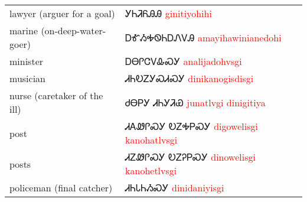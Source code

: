 \begin{multicols}
\begin{minipage}{\linewidth}
\begin{tabular}{p{5cm} p{9cm}}
lawyer (arguer for a goal) & ᎩᏂᏘᏲᎯᎯ 
 \newline \textcolor{red}{ginitiyohihi}\\
marine (on-deep-water-goer) & ᎠᎹᏱᎭᏫᏂᎠᏁᏙᎯ 
 \newline \textcolor{red}{amayihawinianedohi}\\
minister & ᎠᎾᎵᏣᏙᎲᏍᎩ 
 \newline \textcolor{red}{analijadohvsgi}\\
musician & ᏗᏂᎧᏃᎩᏍᏗᏍᎩ 
 \newline \textcolor{red}{dinikanogisdisgi}\\
nurse (caretaker of the ill) & ᏧᎾᏢᎩ ᏗᏂᎩᏘᏯ 
 \newline \textcolor{red}{junatlvgi dinigitiya}\\
post & ᏗᎪᏪᎵᏍᎩ ᎧᏃᎭᏢᏍᎩ 
 \newline \textcolor{red}{digowelisgi kanohatlvsgi}\\
posts & ᏗᏃᏪᎵᏍᎩ ᎧᏃᎮᏢᏍᎩ 
 \newline \textcolor{red}{dinowelisgi kanohetlvsgi}\\
policeman (final catcher) & ᏗᏂᏓᏂᏱᏍᎩ 
 \newline \textcolor{red}{dinidaniyisgi}\\
\end{tabular}
\end{minipage}


\end{multicols}
